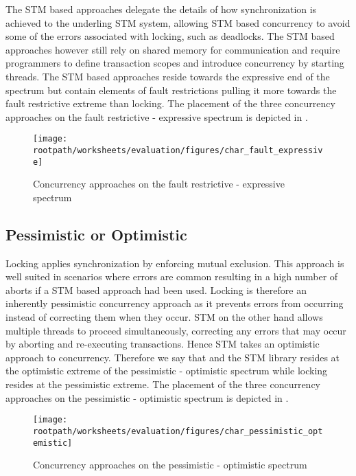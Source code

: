 The \ac{STM} based approaches delegate the details of how synchronization is achieved to the underling \ac{STM} system, allowing \ac{STM} based concurrency to avoid some of the errors associated with locking, such as deadlocks. The \ac{STM} based approaches however still rely on shared memory for communication and require programmers to define transaction scopes and introduce concurrency by starting threads. The \ac{STM} based approaches reside towards the expressive end of the spectrum but contain elements of fault restrictions pulling it more towards the fault restrictive extreme than locking. The placement of the three concurrency approaches on the fault restrictive - expressive spectrum is depicted in  . 
\begin{figure}[htbp]
\centering
 \texttt{[image: \\rootpath/worksheets/evaluation/figures/char\_fault\_expressive]} 
 \caption{Concurrency approaches on the fault restrictive - expressive spectrum}
\label{fig:char_fault_expressive}
\end{figure}

\subsection{Pessimistic or Optimistic}
Locking applies synchronization by enforcing mutual exclusion. This approach is well suited in scenarios where errors are common resulting in a high number of aborts if a \ac{STM} based approach had been used. Locking is therefore an inherently pessimistic concurrency approach as it prevents errors from occurring instead of correcting them when they occur. \ac{STM} on the other hand allows multiple threads to proceed simultaneously, correcting any errors that may occur by aborting and re-executing transactions. Hence \ac{STM} takes an optimistic approach to concurrency.
Therefore we say that \stmnamesp and the \ac{STM} library resides at the optimistic extreme of the pessimistic - optimistic spectrum while locking resides at the pessimistic extreme. The placement of the three concurrency approaches on the pessimistic - optimistic spectrum is depicted in . 
\begin{figure}[htbp]
\centering
 \texttt{[image: \\rootpath/worksheets/evaluation/figures/char\_pessimistic\_optemistic]} 
 \caption{Concurrency approaches on the pessimistic - optimistic spectrum}
\label{fig:char_pes_opti}
\end{figure}

